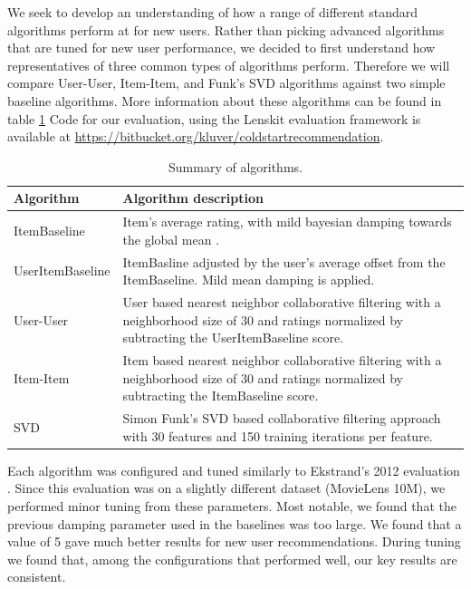 \documentclass[letterpaper]{sig-alternate}
\begin{document}
  We seek to develop an understanding of how a range of different standard algorithms perform at for new users.
  Rather than picking advanced algorithms that are tuned for new user performance, we decided to first understand how representatives of three common types of algorithms perform.
  Therefore we will compare User-User, Item-Item, and Funk's SVD algorithms against two simple baseline algorithms.
  More information about these algorithms can be found in table \ref{tbl:algo}
  Code for our evaluation, using the Lenskit evaluation framework \cite{lenskit} is available at \url{https://bitbucket.org/kluver/coldstartrecommendation}.
  
  \begin{table}
    \centering
    \begin{tabular}{|p{6em}|p{18em}|}
      \hline
      Algorithm          & Algorithm description \\\hline
      ItemBaseline       & Item's average rating, with mild bayesian damping towards the global mean \cite{funk_netflix_2006}. \\\hline
      UserItem\-Baseline & ItemBasline adjusted by the user's average offset from the ItemBaseline. Mild mean damping is applied\cite{funk_netflix_2006}. \\\hline
      User-User          & User based nearest neighbor collaborative filtering \cite{resnick1994grouplens} with a neighborhood size of 30 and ratings normalized by subtracting the UserItemBaseline score. \\\hline
      Item-Item          & Item based nearest neighbor collaborative filtering \cite{sarwar2001item} with a neighborhood size of 30 and ratings normalized by subtracting the ItemBaseline score.   \\\hline
      SVD                & Simon Funk's SVD based collaborative filtering approach \cite{funk_netflix_2006} with 30 features and 150 training iterations per feature. \\\hline
    \end{tabular}
    \caption{Summary of algorithms.}
    \label{tbl:algo}
  \end{table}
  
  Each algorithm was configured and tuned similarly to Ekstrand's 2012 evaluation \cite{ekstrand2012recommenders}.
  Since this evaluation was on a slightly different dataset (MovieLens 10M), we performed minor tuning from these parameters.
  Most notable, we found that the previous damping parameter used in the baselines was too large.
  We found that a value of 5 gave much better results for new user recommendations.
  During tuning we found that, among the configurations that performed well, our key results are consistent.
\end{document}
